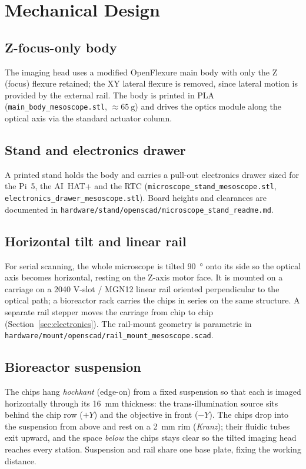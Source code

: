 \section{Mechanical Design}
\label{sec:mechanical}

\subsection{Z-focus-only body}
The imaging head uses a modified OpenFlexure main body with only the Z (focus)
flexure retained; the XY lateral flexure is removed, since lateral motion is
provided by the external rail. The body is printed in PLA
(\texttt{main\_body\_mesoscope.stl}, $\approx\SI{65}{\gram}$) and drives the
optics module along the optical axis via the standard actuator column.

\subsection{Stand and electronics drawer}
A printed stand holds the body and carries a pull-out electronics drawer sized
for the Pi~5, the AI~HAT+ and the RTC (\texttt{microscope\_stand\_mesoscope.stl},
\texttt{electronics\_drawer\_mesoscope.stl}). Board heights and clearances are
documented in \texttt{hardware/stand/openscad/microscope\_stand\_readme.md}.

\subsection{Horizontal tilt and linear rail}
For serial scanning, the whole microscope is tilted \SI{90}{\degree} onto its
side so the optical axis becomes horizontal, resting on the Z-axis motor face.
It is mounted on a carriage on a 2040 V-slot / MGN12 linear rail oriented
perpendicular to the optical path; a bioreactor rack carries the chips in series
on the same structure. A separate rail stepper moves the carriage from chip to
chip (Section~\ref{sec:electronics}). The rail-mount geometry is parametric in
\texttt{hardware/mount/openscad/rail\_mount\_mesoscope.scad}.

\subsection{Bioreactor suspension}
\label{sec:bioreactor}
The chips hang \emph{hochkant} (edge-on) from a fixed suspension so that each is
imaged horizontally through its \SI{16}{\milli\meter} thickness: the
trans-illumination source sits behind the chip row ($+Y$) and the objective in
front ($-Y$). The chips drop into the suspension from above and rest on a
\SI{2}{\milli\meter} rim (\emph{Kranz}); their fluidic tubes exit upward, and the
space \emph{below} the chips stays clear so the tilted imaging head reaches every
station. Suspension and rail share one base plate, fixing the working distance.

